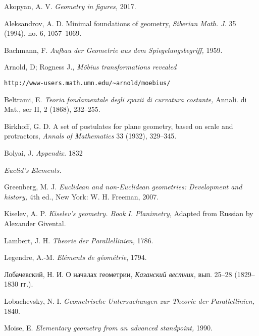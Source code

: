 \renewcommand{\bibname}{Used resources}
\begin{thebibliography}{52}

Akopyan, A. V. 
\textit{Geometry in figures,} 2017.


Aleksandrov, A. D.
Minimal foundations of geometry,
\textit{Siberian Math. J.} 35 (1994), no. 6, 1057--1069.

 Bachmann, F.
\textit{Aufbau der Geometrie aus dem Spiegelungsbegriff,} 1959. 

 Arnold, D; Rogness J., \textit{M\"obius transformations revealed}
\begin{verbatim}http://www-users.math.umn.edu/~arnold/moebius/\end{verbatim}


  Beltrami, E.
\textit{Teoria fondamentale degli spazii di curvatura costante,} 
Annali. di Mat., ser II, 2 (1868), 232--255.

Birkhoff, G. D.
A set of postulates for plane geometry,
based on scale and protractors, 
\textit{Annals of Mathematics} 33 (1932), 329--345.

 Bolyai, J. \textit{Appendix.} 1832

\textit{Euclid's Elements.}

Greenberg, M. J.
\textit{Euclidean and non-Euclidean geometries: Development and history,}
4th ed., New York: W. H. Freeman, 2007.

Kiselev, A. P.
\textit{Kiselev's geometry.
Book I. Planimetry,}
Adapted from Russian by Alexander Givental.


Lambert, J. H.
\textit{Theorie der Parallellinien,}
1786.

Legendre, A.-M.
\textit{El\'ements de g\'eom\'etrie}, 1794.

\begin{otherlanguage}{russian}
Лобачевский, Н. И.  
О началах геометрии, 
\textit{Казанский вестник,} вып. 25--28 (1829--1830 гг.).
\end{otherlanguage}

Lobachevsky, N. I.
\textit{Geometrische Untersuchungen zur Theorie der Parallellinien,} 
1840.


Moise, E.
\textit{Elementary geometry from an advanced standpoint,}  
1990.


\end{thebibliography}
